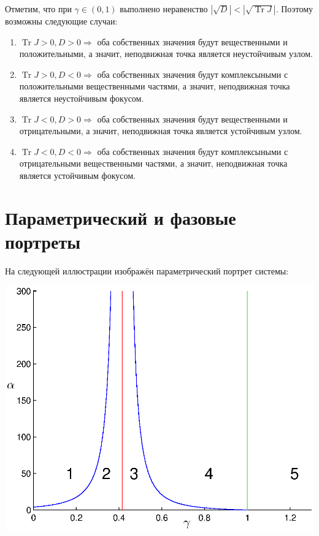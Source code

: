 \documentclass[11pt]{article}
\newcommand\abs[1]{\left\lvert#1\right\rvert}
\DeclareMathOperator{\Tr}{Tr}
\begin{document}
Отметим, что при $\gamma \in (0, 1)$ выполнено неравенство $\abs{\sqrt{D}} < \abs{\sqrt{\Tr J}}$. Поэтому возможны следующие случаи:
\begin{enumerate}
\item
$\Tr J > 0, D > 0 \Rightarrow$ оба собственных значения будут вещественными и положительными, а значит, неподвижная точка является неустойчивым узлом.
\item
$\Tr J > 0, D < 0 \Rightarrow$ оба собственных значения будут комплексыными с положительными вещественными частями, а значит, неподвижная точка является неустойчивым фокусом.
\item
$\Tr J < 0, D > 0 \Rightarrow$ оба собственных значения будут вещественными и отрицательными, а значит, неподвижная точка является устойчивым узлом.
\item
$\Tr J < 0, D < 0 \Rightarrow$ оба собственных значения будут комплексыными с отрицательными вещественными частями, а значит, неподвижная точка является устойчивым фокусом.
\end{enumerate}

\section{Параметрический и фазовые портреты}

На следующей иллюстрации изображён параметрический портрет системы:

\includegraphics[scale=1.0]{pics/param_portrait.eps}
\end{document}
